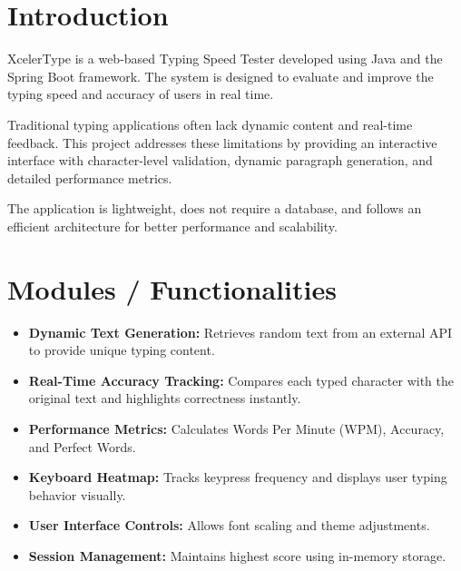 \documentclass[a4paper,12pt]{article}
\begin{document}
\section{Introduction}

XcelerType is a web-based Typing Speed Tester developed using Java and the Spring Boot framework. The system is designed to evaluate and improve the typing speed and accuracy of users in real time.

Traditional typing applications often lack dynamic content and real-time feedback. This project addresses these limitations by providing an interactive interface with character-level validation, dynamic paragraph generation, and detailed performance metrics.

The application is lightweight, does not require a database, and follows an efficient architecture for better performance and scalability.

\section{Modules / Functionalities}

\begin{itemize}

\item \textbf{Dynamic Text Generation:} Retrieves random text from an external API to provide unique typing content.

\item \textbf{Real-Time Accuracy Tracking:} Compares each typed character with the original text and highlights correctness instantly.

\item \textbf{Performance Metrics:} Calculates Words Per Minute (WPM), Accuracy, and Perfect Words.

\item \textbf{Keyboard Heatmap:} Tracks keypress frequency and displays user typing behavior visually.

\item \textbf{User Interface Controls:} Allows font scaling and theme adjustments.

\item \textbf{Session Management:} Maintains highest score using in-memory storage.

\end{itemize}

\end{document}
